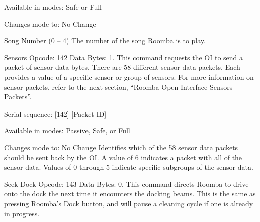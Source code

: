 \begin{Desc}
\begin{description}
\begin{DoxyItemize}
\item Available in modes\+: Safe or Full
\item Changes mode to\+: No Change
\item Song Number (0 – 4) The number of the song Roomba is to play. 
\end{DoxyItemize}\item[{\em 
\hypertarget{group__roomba-lib_gga305e17dfb7050ad83ea49ded2e6a2e24a301ea9dba750cbbe96f96545436b659a}{}R\+O\+O\+M\+B\+A\+\_\+\+S\+E\+N\+S\+O\+R\+S\label{group__roomba-lib_gga305e17dfb7050ad83ea49ded2e6a2e24a301ea9dba750cbbe96f96545436b659a}
}]Sensors Opcode\+: 142 Data Bytes\+: 1. This command requests the O\+I to send a packet of sensor data bytes. There are 58 different sensor data packets. Each provides a value of a specific sensor or group of sensors. For more information on sensor packets, refer to the next section, “\+Roomba Open Interface Sensors Packets”.
\begin{DoxyItemize}
\item Serial sequence\+: \mbox{[}142\mbox{]} \mbox{[}Packet I\+D\mbox{]}
\item Available in modes\+: Passive, Safe, or Full
\item Changes mode to\+: No Change Identifies which of the 58 sensor data packets should be sent back by the O\+I. A value of 6 indicates a packet with all of the sensor data. Values of 0 through 5 indicate specific subgroups of the sensor data. 
\end{DoxyItemize}\item[{\em 
\hypertarget{group__roomba-lib_gga305e17dfb7050ad83ea49ded2e6a2e24aaadf37ce35045bca639aeb6cd10ff6bf}{}R\+O\+O\+M\+B\+A\+\_\+\+S\+E\+E\+K\+\_\+\+D\+O\+C\+K\label{group__roomba-lib_gga305e17dfb7050ad83ea49ded2e6a2e24aaadf37ce35045bca639aeb6cd10ff6bf}
}]Seek Dock Opcode\+: 143 Data Bytes\+: 0. This command directs Roomba to drive onto the dock the next time it encounters the docking beams. This is the same as pressing Roomba’s Dock button, and will pause a cleaning cycle if one is already in progress.

\end{description}
\end{Desc}
